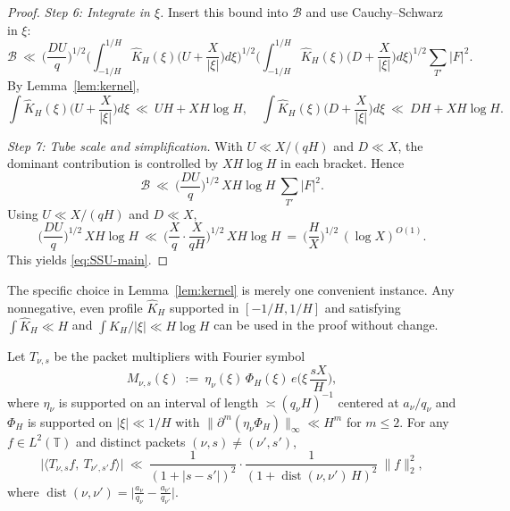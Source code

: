 \begin{proof}
\smallskip
\textit{Step 6: Integrate in $\xi$.}
Insert this bound into $\mathcal B$ and use Cauchy--Schwarz in $\xi$:
\[
\mathcal B \ \ll\ \Big(\frac{DU}{q}\Big)^{1/2}
\Bigg(\int_{-1/H}^{1/H}\!\widehat K_H(\xi)\Big(U+\frac{X}{|\xi|}\Big)d\xi\Bigg)^{\!1/2}
\Bigg(\int_{-1/H}^{1/H}\!\widehat K_H(\xi)\Big(D+\frac{X}{|\xi|}\Big)d\xi\Bigg)^{\!1/2}
\sum_{T'} |F|^2.
\]
By Lemma~\ref{lem:kernel},
\[
\int\widehat K_H(\xi)\Big(U+\frac{X}{|\xi|}\Big)d\xi \ \ll\ U H + X H\log H,
\quad
\int\widehat K_H(\xi)\Big(D+\frac{X}{|\xi|}\Big)d\xi \ \ll\ D H + X H\log H.
\]

\smallskip
\textit{Step 7: Tube scale and simplification.}
With $U\ll X/(qH)$ and $D\ll X$, the dominant contribution is controlled by $XH\log H$ in each bracket. Hence
\[
\mathcal B\ \ll\ \Big(\frac{DU}{q}\Big)^{1/2}\,XH\log H\ \sum_{T'} |F|^2.
\]
Using $U\ll X/(qH)$ and $D\ll X$,
\[
\Big(\frac{DU}{q}\Big)^{1/2}\,XH\log H
\ \ll\ \Big(\frac{X}{q}\cdot\frac{X}{qH}\Big)^{1/2}\,XH\log H
\ =\ \Big(\frac{H}{X}\Big)^{\!1/2} \,(\log X)^{O(1)}.
\]
This yields \eqref{eq:SSU-main}.
\end{proof}

\begin{remark}
The specific choice in Lemma~\ref{lem:kernel} is merely one convenient instance.
Any nonnegative, even profile $\widehat K_H$ supported in $[-1/H,1/H]$ and satisfying
$\int \widehat K_H\ll H$ and $\int \widehat K_H/|\xi|\ll H\log H$
can be used in the proof without change.
\end{remark}

\begin{lemma}\label{lem:slope-orth}
Let $T_{\nu,s}$ be the packet multipliers with Fourier symbol
\[
M_{\nu,s}(\xi)\ :=\ \eta_\nu(\xi)\,\Phi_H(\xi)\,e\!\Big(\xi\,\frac{sX}{H}\Big),
\]
where $\eta_\nu$ is supported on an interval of length $\asymp (q_\nu H)^{-1}$ centered at $a_\nu/q_\nu$ and $\Phi_H$ is supported on $|\xi|\ll 1/H$ with $\|\partial^m(\eta_\nu\Phi_H)\|_\infty\ll H^{m}$ for $m\le2$. For any $f\in L^2(\mathbb T)$ and distinct packets $(\nu,s)\neq(\nu',s')$,
\begin{equation}\label{eq:slope-orth-decay}
\big|\langle T_{\nu,s}f,\ T_{\nu',s'}f\rangle\big|
\ \ll\ \frac{1}{(1+|s-s'|)^2}\cdot\frac{1}{(1+\operatorname{dist}(\nu,\nu')\,H)^2}\ \|f\|_2^2,
\end{equation}
where $\operatorname{dist}(\nu,\nu')=\bigl|\frac{a_\nu}{q_\nu}-\frac{a_{\nu'}}{q_{\nu'}}\bigr|$.
\end{lemma}

